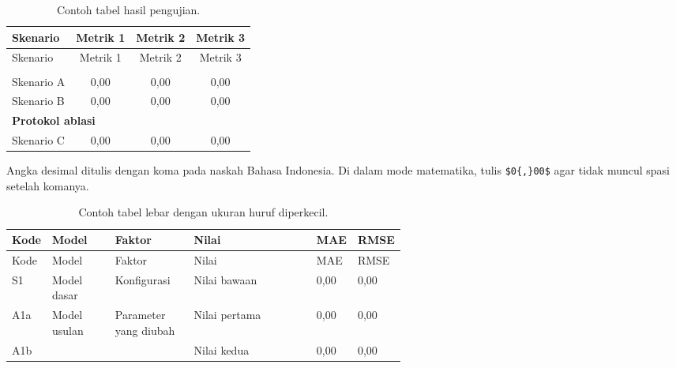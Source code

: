 %
%
\begin{longtable}{|l|c|c|c|}
\caption{Contoh tabel hasil pengujian.}\label{tab:hasil-pengujian}\\
\hline
Skenario & Metrik 1 & Metrik 2 & Metrik 3 \\
\hline
\endfirsthead
\hline
Skenario & Metrik 1 & Metrik 2 & Metrik 3 \\
\hline
\endhead
\hline
\endlastfoot
\multicolumn{4}{|l|}{\textbf{Protokol pengujian utama}} \\
\hline
Skenario A & 0,00 & 0,00 & 0,00 \\
\hline
Skenario B & 0,00 & 0,00 & 0,00 \\
\hline
\multicolumn{4}{|l|}{\textbf{Protokol ablasi}} \\
\hline
Skenario C & 0,00 & 0,00 & 0,00 \\
\end{longtable}

Angka desimal ditulis dengan koma pada naskah Bahasa Indonesia. Di dalam mode matematika, tulis \verb|$0{,}00$| agar tidak muncul spasi setelah komanya.

%
%
\begingroup\footnotesize\setlength{\tabcolsep}{4pt}
\begin{xltabular}{\linewidth}{|P{0.06\linewidth}|P{0.16\linewidth}|P{0.20\linewidth}|Y|P{0.08\linewidth}|P{0.08\linewidth}|}
\caption{Contoh tabel lebar dengan ukuran huruf diperkecil.}\label{tab:hasil-lebar}\\
\hline
Kode & Model & Faktor & Nilai & MAE & RMSE \\
\hline
\endfirsthead
\hline
Kode & Model & Faktor & Nilai & MAE & RMSE \\
\hline
\endhead
\hline
\endlastfoot
S1 & Model dasar & Konfigurasi & Nilai bawaan & 0,00 & 0,00 \\
\hline
A1a & Model usulan & Parameter yang diubah & Nilai pertama & 0,00 & 0,00 \\
A1b & & & Nilai kedua & 0,00 & 0,00 \\
\end{xltabular}\endgroup


